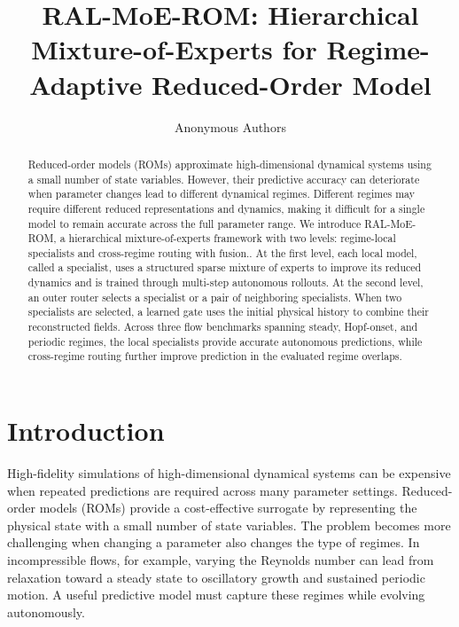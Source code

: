 \documentclass{article}
\title{RAL-MoE-ROM: Hierarchical Mixture-of-Experts for Regime-Adaptive Reduced-Order Model }
\author{Anonymous Authors}
\begin{document}
\raggedbottom

\maketitle

\begin{abstract}
Reduced-order models (ROMs) approximate high-dimensional dynamical systems using a small number of state variables. However, their predictive accuracy can deteriorate when parameter changes lead to different dynamical regimes. Different regimes may require different reduced representations and dynamics, making it difficult for a single model to remain accurate across the full parameter range. We introduce RAL-MoE-ROM, a hierarchical mixture-of-experts framework with two levels: regime-local specialists and cross-regime routing with fusion.. At the first level, each local model, called a specialist, uses a structured sparse mixture of experts to improve its reduced dynamics and is trained through multi-step autonomous rollouts. At the second level, an outer router selects a specialist or a pair of neighboring specialists. When two specialists are selected, a learned gate uses the initial physical history to combine their reconstructed fields. Across three flow benchmarks spanning steady, Hopf-onset, and periodic regimes, the local specialists provide accurate autonomous predictions, while cross-regime routing further improve prediction in the evaluated regime overlaps.
\end{abstract}

\section{Introduction}

High-fidelity simulations of high-dimensional dynamical systems
can be expensive when repeated predictions are required across many parameter settings. Reduced-order models (ROMs) provide a cost-effective surrogate by representing the physical state with a small number of state variables. The problem becomes more challenging when changing a parameter also changes the type of regimes. In incompressible flows, for example, varying the Reynolds number can lead from relaxation toward a steady state to oscillatory growth and sustained periodic motion. A useful predictive model must capture these regimes while evolving autonomously.
\end{document}
